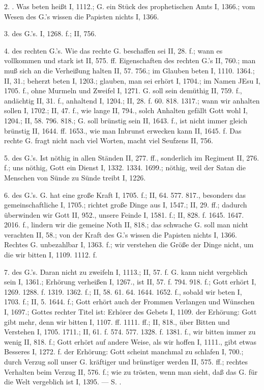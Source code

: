 2. . Was beten heißt I, 1112.; G. ein Stück des prophetischen Amts I, 1366.; vom Wesen des G.’s wissen die Papisten nichts I, 1366.

3.  des G.’s. I, 1268. f.; II, 756.

4.  des rechten G.’s. Wie das rechte G. beschaffen sei II, 28. f.; wann es vollkommen und stark ist II, 575. ff. Eigenschaften des rechten G.’s II, 760.; man muß sich an die Verheißung halten II, 57. 756.; im Glauben beten I, 1110. 1364.; II, 31.; beherzt beten I, 1203.; glauben, man sei erhört I, 1704.; im Namen JEsu I, 1705. f., ohne Murmeln und Zweifel I, 1271. G. soll sein demüthig II, 759. f., andächtig II, 31. f., anhaltend I, 1204.; II, 28. f. 60. 818. 1317.; wann wir anhalten sollen I, 1702.; II, 47. f., wie lange II, 794., solch Anhalten gefällt Gott wohl I, 1204.; II, 58. 796. 818.; G. soll brünstig sein II, 1643. f., ist nicht immer gleich brünstig II, 1644. ff. 1653., wie man Inbrunst erwecken kann II, 1645. f. Das rechte G. fragt nicht nach viel Worten, macht viel Seufzens II, 756.

5.  des G.’s. Ist nöthig in allen Ständen II, 277. ff., sonderlich im Regiment II, 276. f.; uns nöthig, Gott ein Dienst I, 1332. 1334. 1699.; nöthig, weil der Satan die Menschen von Sünde zu Sünde treibt I, 1226.

6.  des G.’s. G. hat eine große Kraft I, 1705. f.; II, 64. 577. 817., besonders das gemeinschaftliche I, 1705.; richtet große Dinge aus I, 1547.; II, 29. ff.; dadurch überwinden wir Gott II, 952., unsere Feinde I, 1581. f.; II, 828. f. 1645. 1647. 2016. f., lindern wir die gemeine Noth II, 818.; das schwache G. soll man nicht verachten II, 58.; von der Kraft des G.’s wissen die Papisten nichts I, 1366. Rechtes G. unbezahlbar I, 1363. f.; wir verstehen die Größe der Dinge nicht, um die wir bitten I, 1109. 1112. f.

7.  des G.’s. Daran nicht zu zweifeln I, 1113.; II, 57. f. G. kann nicht vergeblich sein I, 1361.; Erhörung verheißen I, 1267., ist  II, 57. f. 794. 918. f.; Gott erhört I, 1269. 1288. f. 1319. 1362. f.; II, 58. 61. 64. 1644. 1652. f., sobald wir beten I, 1703. f.; II, 5. 1644. f.; Gott erhört auch der Frommen Verlangen und Wünschen I, 1697.; Gottes rechter Titel ist: Erhörer des Gebets I, 1109.  der Erhörung: Gott gibt mehr, denn wir bitten I, 1107. ff. 1111. ff.; II, 818., über Bitten und Verstehen I, 1705. 1711.; II, 61. f. 574. 577. 1328. f. 1381. f., wir bitten immer zu wenig II, 818. f.; Gott erhört auf andere Weise, als wir hoffen I, 1111., gibt etwas Besseres I, 1272. f.  der Erhörung: Gott scheint manchmal zu schlafen I, 700.; durch Verzug soll unser G. kräftiger und brünstiger werden II, 575. ff.; rechtes Verhalten beim Verzug II, 576. f.; wie zu trösten, wenn man sieht, daß das G. für die Welt vergeblich ist I, 1395. — S. .

